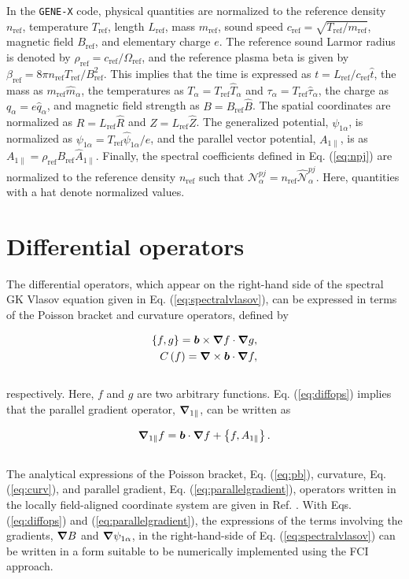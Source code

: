 \documentclass[preprint,12pt]{elsarticle}
\newcommand{\N}{\mathcal{N}_{\alpha}}
\newcommand{\nN}{\mathcal{\hat{N}}_\alpha}
\renewcommand{\a}{\alpha}
\newcommand{\csref}{c_{\mathrm{ref}}}
\newcommand{\nref}{n_{\mathrm{ref}}}
\newcommand{\Lref}{L_{\mathrm{ref}}}
\newcommand{\rhoref}{\rho_{\mathrm{ref}}}
\newcommand{\Bref}{B_{\mathrm{ref}}}
\newcommand{\mref}{m_{\mathrm{ref}}}
\newcommand{\Tref}{T_{\mathrm{ref}}}
\newcommand{\Omegaref}{\Omega_{\mathrm{ref}}}
\newcommand{\betaref}{\beta_{\mathrm{ref}}}
\renewcommand{\pb}[2]{\left\{ #1, #2\right\}}
\newcommand{\curv}[1]{C\left( #1\right)}
\begin{document}
In the \verb|GENE-X| code, physical quantities are normalized to the reference density $\nref$, temperature $\Tref$, length $\Lref$, mass $\mref$, sound speed $\csref = \sqrt{\Tref / \mref}$, magnetic field $\Bref$, and elementary charge $e$. The reference sound Larmor radius is denoted by $\rhoref = \csref / \Omegaref$, and the reference plasma beta is given by $\betaref = 8 \pi \nref \Tref / \Bref^2$. This implies that the time is expressed as $t = \Lref / \csref \hat t$, the mass as $\mref \hat m_\alpha$, the temperatures as $T_\a =  \Tref \hat T_\a$ and $\tau_\a = \Tref \hat \tau_\a$, the charge as $q_\alpha = e \hat q_\alpha$, and magnetic field strength as $B = \Bref \hat B$. The spatial coordinates are normalized as $R =  \Lref \hat R$ and $Z =  \Lref \hat Z$. The generalized potential, $\psi_{1 \alpha}$, is normalized as  $\psi_{1 \alpha} = \Tref \hat \psi_{1 \alpha}  / e$, and the parallel vector potential, $A_{1 \parallel}$, is as  $A_{1 \parallel} = \rhoref \Bref \hat A_{1 \parallel}$. Finally, the spectral coefficients defined in Eq. (\ref{eq:npj}) are normalized to the reference density $\nref$ such that $\N^{pj} = \nref \nN^{pj}$. Here, quantities with a hat denote normalized values.

\section{Differential operators}
\label{appendix:differentialoperators}

The differential operators, which appear on the right-hand side of the spectral GK Vlasov equation given in Eq. (\ref{eq:spectralvlasov}), can be expressed in terms of the Poisson bracket and curvature operators, defined by

\begin{subequations} \label{eq:diffops}
  \begin{align}
    \pb{f}{g} = \bm b \times \grad f \cdot \grad g, \label{eq:pb}\\
    \curv{f} = \grad \times \bm b \cdot \grad f \label{eq:curv},
  \end{align}
\end{subequations}
\\
respectively. Here, $f$ and $g$ are two arbitrary functions. Eq. (\ref{eq:diffops}) implies that the parallel gradient operator, $\grad_{1 \parallel}$, can be written as

\begin{align} \label{eq:parallelgradient}
  \grad_{1 \parallel} f = \bm b \cdot \grad f  + \pb{f}{A_{1 \parallel}}.
\end{align}
\\
The analytical expressions of the Poisson bracket, Eq. (\ref{eq:pb}), curvature, Eq. (\ref{eq:curv}), and parallel gradient, Eq. (\ref{eq:parallelgradient}), operators written in the locally field-aligned coordinate system are given in Ref. \cite{michels2021}. With Eqs. (\ref{eq:diffops}) and (\ref{eq:parallelgradient}), the expressions of the terms involving the gradients, $\grad B$ and $\grad \psi_{ 1 \a}$, in the right-hand-side of Eq. (\ref{eq:spectralvlasov}) can be written in a form suitable to be numerically implemented using the FCI approach.
\end{document}
